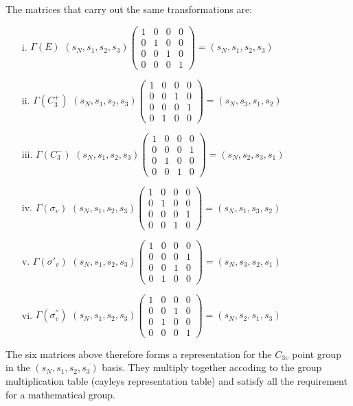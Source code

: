 \documentclass[a4paper, 12pt, openany]{report}
\begin{document}
The matrices that carry out the same transformations are:
\begin{itemize}
	\item[i.] $\Gamma(E)$ \hspace{0.5cm}$(s_N,s_1,s_2,s_3) \begin{pmatrix}
	1&0&0&0\\0&1&0&0\\0&0&1&0\\0&0&0&1\end{pmatrix}=(s_N,s_1,s_2,s_3)$
		\item[ii.] $\Gamma(C_3^+)$ \hspace{0.5cm}$(s_N,s_1,s_2,s_3) \begin{pmatrix}
	1&0&0&0\\0&0&1&0\\0&0&0&1\\0&1&0&0\end{pmatrix}=(s_N,s_3,s_1,s_2)$
	\item[iii.] $\Gamma(C_3^-)$ \hspace{0.5cm}$(s_N,s_1,s_2,s_3) \begin{pmatrix}
	1&0&0&0\\0&0&0&1\\0&1&0&0\\0&0&1&0\end{pmatrix}=(s_N,s_2,s_3,s_1)$
	\item[iv.] $\Gamma(\sigma_v)$ \hspace{0.5cm}$(s_N,s_1,s_2,s_3) \begin{pmatrix}
	1&0&0&0\\0&1&0&0\\0&0&0&1\\0&0&1&0\end{pmatrix}=(s_N,s_1,s_3,s_2)$
		\item[v.] $\Gamma(\sigma'_v)$ \hspace{0.5cm}$(s_N,s_1,s_2,s_3) \begin{pmatrix}
	1&0&0&0\\0&0&0&1\\0&0&1&0\\0&1&0&0\end{pmatrix}=(s_N,s_3,s_2,s_1)$
	
		\item[vi.] $\Gamma(\sigma_v^{''})$ 		\hspace{0.5cm}$(s_N,s_1,s_2,s_3) \begin{pmatrix}
	1&0&0&0\\0&0&1&0\\0&1&0&0\\0&0&0&1\end{pmatrix}=(s_N,s_2,s_1,s_3)$
\end{itemize}
The six matrices above therefore forms a representation for the $C_{3v}$ point group in the $(s_N,s_1,s_2,s_3)$ basis. They multiply together accoding to the group \linebreak multiplication table (cayleys representation table) and satisfy all the requirement for a mathematical group.
\end{document}
